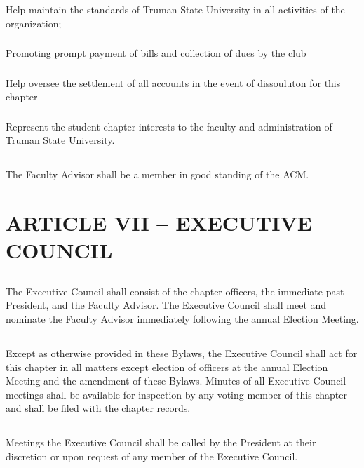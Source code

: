 \documentclass[12pt]{article}
\begin{document}
\subsubsection{}	Help maintain the standards of Truman State University in all activities of the organization;
\subsubsection{}	Promoting prompt payment of bills and collection of dues by the club
\subsubsection{}	Help oversee the settlement of all accounts in the event of dissouluton for this chapter
\subsubsection{}	Represent the student chapter interests to the faculty and administration of Truman State University.
\subsection{}	The Faculty Advisor shall be a member in good standing of the ACM.

\section{ARTICLE VII – EXECUTIVE COUNCIL}
\subsection{}	The Executive Council shall consist of the chapter officers, the immediate past President, and the Faculty Advisor. The Executive Council shall meet and nominate the Faculty Advisor immediately following the annual Election Meeting.
\subsection{}	Except as otherwise provided in these Bylaws, the Executive Council shall act for this chapter in all matters except election of officers at the annual Election Meeting and the amendment of these Bylaws. Minutes of all Executive Council meetings shall be available for inspection by any voting member of this chapter and shall be filed with the chapter records.
\subsection{}	Meetings the Executive Council shall be called by the President at their discretion or upon request of any member of the Executive Council.
\end{document}

